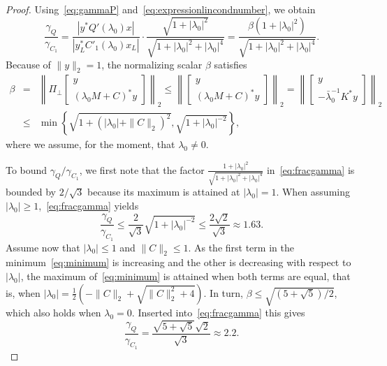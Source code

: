 \documentclass[12pt]{article}
\begin{document}
\begin{proof}
Using~\eqref{eq:gammaP} and~\eqref{eq:expressionlincondnumber}, we obtain
    \begin{equation} \label{eq:fracgamma}
        \frac{\gamma_Q}{\gamma_{C_1}} =
        \frac{|y^*Q'(\lambda_0)x|}{|y_L^*C'_1(\lambda_0)x_L|}\cdot \frac{\sqrt{1+|\lambda_0|^2}}{\sqrt{1+|\lambda_0|^2+|\lambda_0|^4}} =\frac{\beta (1+|\lambda_0|^2)}{\sqrt{1+|\lambda_0|^2+|\lambda_0|^4}}.
    \end{equation}
    Because of $\|y\|_2 = 1$, the normalizing scalar $\beta$ satisfies
\begin{eqnarray} 
\beta &=& \left\| \Pi_{\perp} \begin{bmatrix}
        y\\
        (\lambda_0M+C)^*y
\end{bmatrix}\right\|_2 \le  \left\| \begin{bmatrix}
        y\\
        (\lambda_0M+C)^*y
\end{bmatrix}\right\|_2  = 
\left\| \begin{bmatrix}
        y\\
        - \bar \lambda_0^{-1} K^* y
\end{bmatrix}\right\|_2 \nonumber \\
&\le& \min \left\{ \sqrt{1+(|\lambda_0|+\|C\|_2)^2}, \sqrt{1+|\lambda_0|^{-2}} \right\}, \label{eq:minimum}
\end{eqnarray}
where we assume, for the moment, that $\lambda_0\not=0$.
    
To bound $\gamma_Q/\gamma_{C_1}$, we first note that the factor $\frac{1+|\lambda_0|^2}{\sqrt{1+|\lambda_0|^2+|\lambda_0|^4}}$ in~\eqref{eq:fracgamma} is bounded by $2/\sqrt{3}$ because its maximum is attained at $|\lambda_0| = 1$. When assuming $|\lambda_0|\geq 1$,~\eqref{eq:fracgamma}  yields
    \[
        \frac{\gamma_Q}{\gamma_{C_1}} 
        \leq \frac{2}{\sqrt{3}} \sqrt{1+|\lambda_0|^{-2}} \leq \frac{2\sqrt{2}}{\sqrt{3}} \approx 1.63.
    \]
Assume now that $|\lambda_0|\leq 1$ and $\|C\|_2 \leq 1$. As the first term in the minimum~\eqref{eq:minimum} is increasing and the other is decreasing with respect to $|\lambda_0|$, the maximum of~\eqref{eq:minimum} is attained when both terms are equal, that is, when 
$|\lambda_0| = \frac12(-\|C\|_2+\sqrt{\|C\|_2^2+4})$. In turn,
$\beta \le \sqrt{ (5+\sqrt{5})/2}$, which also holds when $\lambda_0 = 0$. Inserted into~\eqref{eq:fracgamma} this gives
\[
    \frac{\gamma_Q}{\gamma_{C_1}} = \frac{\sqrt{5+\sqrt{5}} \sqrt{2} }{\sqrt{3}} \approx 2.2. 
\]


\end{proof}
\end{document}
